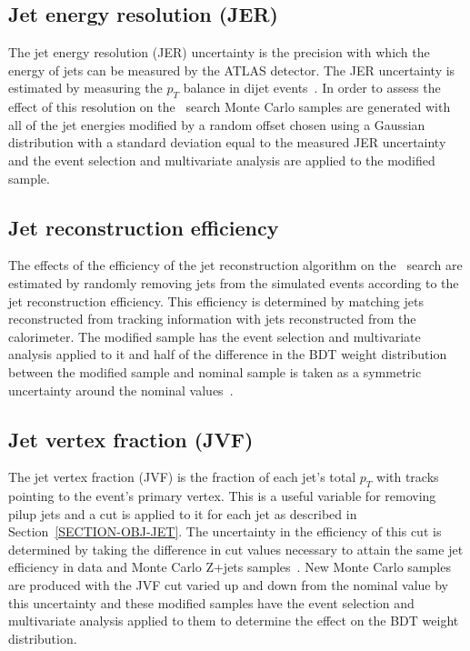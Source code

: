 \subsection{Jet energy resolution (JER)}
\label{SECTION-RESULTS-SYSTEMATICS-JER}
The jet energy resolution (JER) uncertainty is the precision with which the energy of jets can be measured by the ATLAS detector. The JER uncertainty is estimated by measuring the $p_T$ balance in dijet events~\cite{JER}. In order to assess the effect of this resolution on the \Wprime\ search Monte Carlo samples are generated with all of the jet energies modified by a random offset chosen using a Gaussian distribution with a standard deviation equal to the measured JER uncertainty and the event selection and multivariate analysis are applied to the modified sample.

\subsection{Jet reconstruction efficiency}
\label{SECTION-RESULTS-SYSTEMATICS-JETRECO}
The effects of the efficiency of the jet reconstruction algorithm on the \Wprime\ search are estimated by randomly removing jets from the simulated events according to the jet reconstruction efficiency. This efficiency is determined by matching jets reconstructed from tracking information with jets reconstructed from the calorimeter. The modified sample has the event selection and multivariate analysis applied to it and half of the difference in the BDT weight distribution between the modified sample and nominal sample is taken as a symmetric uncertainty around the nominal values~\cite{JETRECO}.

\subsection{Jet vertex fraction (JVF)}
\label{SECTION-RESULTS-SYSTEMATICS-JVF}
The jet vertex fraction (JVF) is the fraction of each jet's total $p_T$ with tracks pointing to the event's primary vertex. This is a useful variable for removing pilup jets and a cut is applied to it for each jet as described in Section~\ref{SECTION-OBJ-JET}. The uncertainty in the efficiency of this cut is determined by taking the difference in cut values necessary to attain the same jet efficiency in data and Monte Carlo Z+jets samples~\cite{JVF}. New Monte Carlo samples are produced with the JVF cut varied up and down from the nominal value by this uncertainty and these modified samples have the event selection and multivariate analysis applied to them to determine the effect on the BDT weight distribution.

